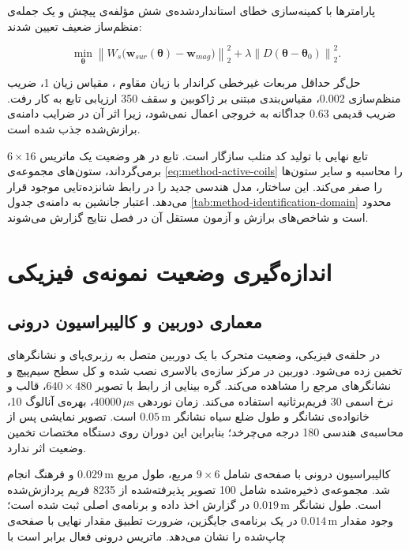 پارامترها با کمینه‌سازی خطای استانداردشده‌ی شش مؤلفه‌ی پیچش و یک جمله‌ی منظم‌ساز ضعیف تعیین شدند:

\begin{equation}
	\min_{\boldsymbol\theta}
	\left\|W_s\big(\mathbf w_{sur}(\boldsymbol\theta)-\mathbf w_{mag}\big)\right\|_2^2+
	\lambda\left\|D(\boldsymbol\theta-\boldsymbol\theta_0)\right\|_2^2.
	\label{eq:method-surrogate-fit}
\end{equation}

حل‌گر حداقل مربعات غیرخطی کراندار با زیان مقاوم ، مقیاس زیان 1، ضریب منظم‌سازی $0.002$، مقیاس‌بندی مبتنی بر ژاکوبین و سقف 350 ارزیابی تابع به کار رفت. ضریب قدیمی $0.63$ جداگانه به خروجی اعمال نمی‌شود، زیرا اثر آن در ضرایب دامنه‌ی برازش‌شده جذب شده است.

تابع نهایی  با تولید کد متلب سازگار است. تابع در هر وضعیت یک ماتریس $6\times16$ برمی‌گرداند، ستون‌های مجموعه‌ی \ref{eq:method-active-coils} را محاسبه و سایر ستون‌ها را صفر می‌کند. این ساختار، مدل هندسی جدید را در رابط شانزده‌تایی موجود قرار می‌دهد. اعتبار جانشین به دامنه‌ی جدول \ref{tab:method-identification-domain} محدود است و شاخص‌های برازش و آزمون مستقل آن در فصل نتایج گزارش می‌شوند.

\section{اندازه‌گیری وضعیت نمونه‌ی فیزیکی}
\label{sec:method-vision}

\subsection{معماری دوربین و کالیبراسیون درونی}

در حلقه‌ی فیزیکی، وضعیت متحرک با یک دوربین متصل به رزبری‌پای و نشانگرهای  تخمین زده می‌شود. دوربین در مرکز سازه‌ی بالاسری نصب شده و کل سطح سیم‌پیچ و نشانگرهای مرجع را مشاهده می‌کند. گره بینایی از رابط  با تصویر $640\times480$، قالب  و نرخ اسمی $30$ فریم‌برثانیه استفاده می‌کند. زمان نوردهی $40000\,\mu\mathrm s$، بهره‌ی آنالوگ 10، خانواده‌ی نشانگر  و طول ضلع سیاه نشانگر $0.05\,\mathrm m$ است. تصویر نمایشی پس از محاسبه‌ی هندسی 180 درجه می‌چرخد؛ بنابراین این دوران روی دستگاه مختصات تخمین وضعیت اثر ندارد.

کالیبراسیون درونی با صفحه‌ی  شامل $9\times6$ مربع، طول مربع $0.029\,\mathrm m$ و فرهنگ  انجام شد. مجموعه‌ی ذخیره‌شده شامل 100 تصویر پذیرفته‌شده از 8235 فریم پردازش‌شده است. طول نشانگر $0.019\,\mathrm m$ در گزارش اخذ داده و برنامه‌ی اصلی ثبت شده است؛ وجود مقدار $0.014\,\mathrm m$ در یک برنامه‌ی جایگزین، ضرورت تطبیق مقدار نهایی با صفحه‌ی چاپ‌شده را نشان می‌دهد. ماتریس درونی فعال برابر است با


